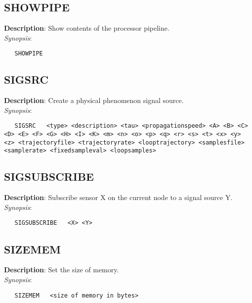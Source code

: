 \subsection{\bf SHOWPIPE}
\label{manpages:SHOWPIPE}
\label{manpages:showpipe}
\vspace{-0.2in}
{\bf Description}: 	Show contents of the processor pipeline.\\[1.5ex]
{\em Synopsis}:
\vspace{-0.2in}
\scriptsize
\begin{verbatim}
   SHOWPIPE   				
\end{verbatim}
\normalsize
\vspace{-0.2in}


\subsection{\bf SIGSRC}
\label{manpages:SIGSRC}
\label{manpages:sigsrc}
\vspace{-0.2in}
{\bf Description}: 	Create a physical phenomenon signal source.\\[1.5ex]
{\em Synopsis}:
\vspace{-0.2in}
\scriptsize
\begin{verbatim}
   SIGSRC   <type> <description> <tau> <propagationspeed> <A> <B> <C> <D> <E> <F> <G> <H> <I> <K> <m> <n> <o> <p> <q> <r> <s> <t> <x> <y> <z> <trajectoryfile> <trajectoryrate> <looptrajectory> <samplesfile> <samplerate> <fixedsampleval> <loopsamples>	
\end{verbatim}
\normalsize
\vspace{-0.2in}


\subsection{\bf SIGSUBSCRIBE}
\label{manpages:SIGSUBSCRIBE}
\label{manpages:sigsubscribe}
\vspace{-0.2in}
{\bf Description}: 	Subscribe sensor X on the current node to a signal source Y.\\[1.5ex]
{\em Synopsis}:
\vspace{-0.2in}
\scriptsize
\begin{verbatim}
   SIGSUBSCRIBE   <X> <Y>	
\end{verbatim}
\normalsize
\vspace{-0.2in}


\subsection{\bf SIZEMEM}
\label{manpages:SIZEMEM}
\label{manpages:sizemem}
\vspace{-0.2in}
{\bf Description}: 	Set the size of memory.\\[1.5ex]
{\em Synopsis}:
\vspace{-0.2in}
\scriptsize
\begin{verbatim}
   SIZEMEM   <size of memory in bytes>			
\end{verbatim}
\normalsize
\vspace{-0.2in}


